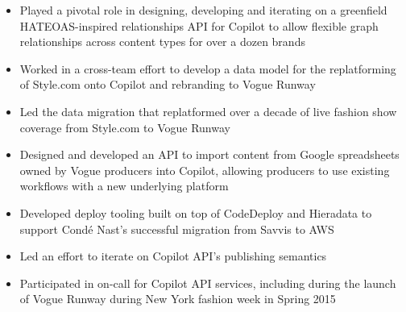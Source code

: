 \begin{itemize}
  \item Played a pivotal role in designing, developing and iterating on a
    greenfield HATEOAS-inspired relationships API for Copilot to allow flexible
    graph relationships across content types for over a dozen brands
  \item Worked in a cross-team effort to develop a data model for the
    replatforming of Style.com onto Copilot and rebranding to Vogue Runway
  \item Led the data migration that replatformed over a decade of live fashion
  show coverage from Style.com to Vogue Runway
  \item Designed and developed an API to import content from Google spreadsheets
    owned by Vogue producers into Copilot, allowing producers to use existing
    workflows with a new underlying platform
  \item Developed deploy tooling built on top of CodeDeploy and Hieradata to
    support Cond\'{e} Nast's successful migration from Savvis to AWS
  \item Led an effort to iterate on Copilot API's publishing semantics
  \item Participated in on-call for Copilot API services, including during the
    launch of Vogue Runway during New York fashion week in Spring 2015
\end{itemize}
